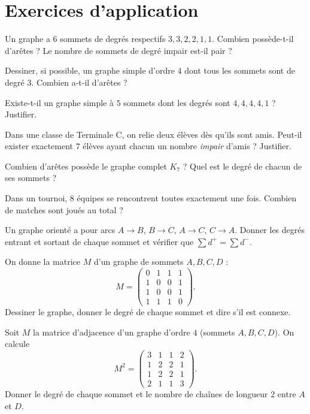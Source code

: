 \section{Exercices d'application}

\exo{} Un graphe a $6$ sommets de degrés respectifs $3,3,2,2,1,1$. Combien
possède-t-il d'arêtes ? Le nombre de sommets de degré impair est-il pair ?

\exo{} Dessiner, si possible, un graphe simple d'ordre $4$ dont tous les sommets
sont de degré $3$. Combien a-t-il d'arêtes ?

\exo{} Existe-t-il un graphe simple à $5$ sommets dont les degrés sont
$4,4,4,4,1$ ? Justifier.

\exo{} Dans une classe de Terminale C, on relie deux élèves dès qu'ils sont amis.
Peut-il exister exactement $7$ élèves ayant chacun un nombre \emph{impair} d'amis ? Justifier.

\exo{} Combien d'arêtes possède le graphe complet $K_7$ ? Quel est le degré de
chacun de ses sommets ?

\exo{} Dans un tournoi, $8$ équipes se rencontrent toutes exactement une fois.
Combien de matches sont joués au total ?

\exo{} Un graphe orienté a pour arcs $A\!\to\!B$, $B\!\to\!C$, $A\!\to\!C$,
$C\!\to\!A$. Donner les degrés entrant et sortant de chaque sommet et vérifier que
$\sum d^{+}=\sum d^{-}$.

\exo{} On donne la matrice $M$ d'un graphe de sommets $A,B,C,D$ :
\[
M=\begin{pmatrix}0&1&1&1\\1&0&0&1\\1&0&0&1\\1&1&1&0\end{pmatrix}.
\]
Dessiner le graphe, donner le degré de chaque sommet et dire s'il est connexe.

\exo{} Soit $M$ la matrice d'adjacence d'un graphe d'ordre $4$ (sommets
$A,B,C,D$). On calcule
\[
M^2=\begin{pmatrix}3&1&1&2\\1&2&2&1\\1&2&2&1\\2&1&1&3\end{pmatrix}.
\]
Donner le degré de chaque sommet et le nombre de chaînes de longueur $2$ entre $A$ et $D$.

